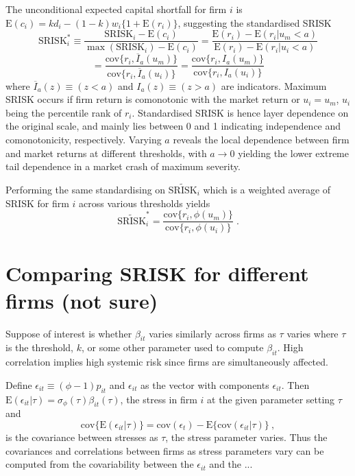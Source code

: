 \documentclass[authoryear]{elsarticle}
\newcommand{\E}{\mathrm{E}}
\newcommand{\cov}{\mathrm{cov}}
\newcommand{\eps}{\epsilon}
\begin{document}
The unconditional expected capital shortfall for firm $i$ is $\E(c_i)=kd_i-(1-k)w_i\{1+\E(r_i)\}$, suggesting the standardised SRISK
$$
\mathrm{SRISK}_i^* \equiv \frac{\mathrm{SRISK}_i-\E(c_i)}{\max(\mathrm{SRISK}_i)-\E(c_i)}
=\frac{\E(r_i)-\E(r_i|u_m<a)}{\E(r_i)-\E(r_i|u_i<a)}
$$
$$
=\frac{\cov\{r_i,\overline{I}_a(u_m)\}}{\cov\{r_i,\overline{I}_a(u_i)\}}
=\frac{\cov\{r_i,I_a(u_m)\}}{\cov\{r_i,I_a(u_i)\}} 
$$
where $\overline{I}_a(z)\equiv (z<a)$ and $I_a(z)\equiv (z>a)$ are indicators. Maximum SRISK occurs if firm return is comonotonic with the market return or $u_i=u_m$, $u_i$ being the percentile rank of $r_i$. Standardised SRISK is hence layer dependence on the original scale, and mainly lies between 0 and 1 indicating independence and comonotonicity, respectively. Varying $a$ reveals the local dependence between firm and market returns at different thresholds, with $a\rightarrow 0$ yielding the lower extreme tail dependence in a market crash of maximum severity.

Performing the same standardising on $\widetilde{\mathrm{SRISK}}_i$ which is a weighted average of SRISK for firm $i$ across various thresholds yields
$$
\widetilde{\mathrm{SRISK}}_i^* = \frac{\cov\{r_i,\phi(u_m)\}}{\cov\{r_i,\phi(u_i)\}}   \;.
$$





\section{Comparing SRISK for different firms (not sure)}

Suppose of interest is whether $\beta_{it}$ varies similarly  across firms as $\tau$ varies where $\tau$ is the threshold, $k$, or some other parameter used to compute $\beta_{it}$. High correlation implies high systemic risk since firms are simultaneously affected.

Define $\eps_{it}\equiv(\phi-1)p_{it}$ and $\eps_{it}$ as the vector with components $\eps_{it}$.  Then $\E(\eps_{it}|\tau)=\sigma_\phi(\tau)\beta_{it}(\tau)$, the stress in firm $i$ at the given parameter setting $\tau$  and
$$
\cov\{\E(\eps_{it}|\tau)\}=\cov(\eps_{t})-\E\{\cov(\eps_{it}|\tau)\}\ ,
$$
is the covariance between stresses as $\tau$, the stress parameter varies.   Thus the covariances and correlations between firms as stress parameters vary can be computed from the covariability between the $\eps_{it}$ and the ...
\end{document}
